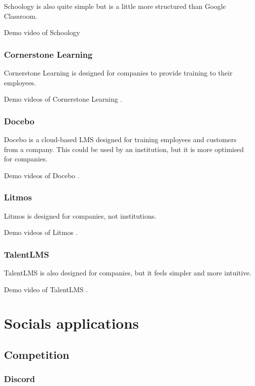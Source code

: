 Schoology is also quite simple but is a little more structured than Google Classroom.

Demo video of Schoology \cite{schoology_demo}

\subsubsection{Cornerstone Learning}

Cornerstone Learning is designed for companies to provide training to their employees.

Demo videos of Cornerstone Learning \cite{Cornerstone_demo_1}\cite{Cornerstone_demo_2}.

\subsubsection{Docebo}

Docebo is a cloud-based LMS designed for training employees and customers from a company. This could be used by an institution, but it is more optimised for companies.

Demo videos of Docebo \cite{Docebo_demo_1}\cite{Docebo_demo_2}.

\subsubsection{Litmos}

Litmos is designed for companies, not institutions.

Demo videos of Litmos \cite{Litmos_demo}.

\subsubsection{TalentLMS}

TalentLMS is also designed for companies, but it feels simpler and more intuitive. 

Demo video of TalentLMS \cite{TalentLMS_demo}.


\section{Socials applications}

\subsection{Competition}

\subsubsection{Discord}

